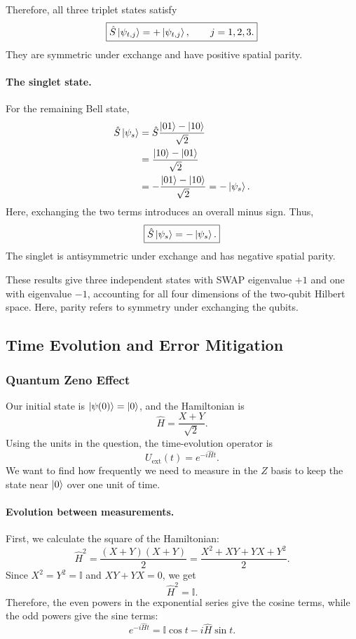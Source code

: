 \documentclass[11pt]{article}
\begin{document}
Therefore, all three triplet states satisfy
\[
\boxed{\hat{S}\ket{\psi_{t,j}}=+\ket{\psi_{t,j}},
\qquad j=1,2,3.}
\]
They are symmetric under exchange and have positive
spatial parity.

\paragraph{The singlet state.}
For the remaining Bell state,
\[
\begin{aligned}
\hat{S}\ket{\psi_s}
&=\hat{S}\frac{\ket{01}-\ket{10}}{\sqrt{2}}\\
&=\frac{\ket{10}-\ket{01}}{\sqrt{2}}\\
&=-\frac{\ket{01}-\ket{10}}{\sqrt{2}}
=-\ket{\psi_s}.
\end{aligned}
\]
Here, exchanging the two terms introduces an overall
minus sign. Thus,
\[
\boxed{\hat{S}\ket{\psi_s}=-\ket{\psi_s}.}
\]
The singlet is antisymmetric under exchange and has
negative spatial parity.

These results give three independent states with SWAP
eigenvalue $+1$ and one with eigenvalue $-1$, accounting
for all four dimensions of the two-qubit Hilbert space.
Here, parity refers to symmetry under exchanging the
qubits. 



\setcounter{subsection}{2}
\subsection{Time Evolution and Error Mitigation}
\setcounter{subsubsection}{0}
\subsubsection{Quantum Zeno Effect}

Our initial state is $\ket{\psi(0)}=\ket{0}$, and the
Hamiltonian is
\[
\hat{H}=\frac{X+Y}{\sqrt{2}}.
\]
Using the units in the question, the time-evolution
operator is
\[
U_{\mathrm{ext}}(t)=e^{-i\hat{H}t}.
\]
We want to find how frequently we need to measure in
the $Z$ basis to keep the state near $\ket{0}$ over
one unit of time.

\paragraph{Evolution between measurements.}
First, we calculate the square of the Hamiltonian:
\[
\hat{H}^2
=
\frac{(X+Y)(X+Y)}{2}
=
\frac{X^2+XY+YX+Y^2}{2}.
\]
Since $X^2=Y^2=\mathbb{I}$ and $XY+YX=0$, we get
\[
\hat{H}^2=\mathbb{I}.
\]
Therefore, the even powers in the exponential series
give the cosine terms, while the odd powers give the
sine terms:
\[
e^{-i\hat{H}t}
=
\mathbb{I}\cos t-i\hat{H}\sin t.
\]
\end{document}
